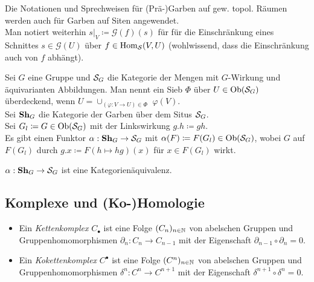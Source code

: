 \documentclass{cheat-sheet}
\newcommand{\CC}[1]{{#1}_{\bullet}} %
\newcommand{\CCC}[1]{{#1}^{\bullet}} %
\newcommand{\Garb}{\mathcal{G}} %
\begin{document}
\begin{bem}
  Die Notationen und Sprechweisen für (Prä-)Garben auf gew. topol. Räumen werden auch für Garben auf Siten angewendet. \\
  Man notiert weiterhin $s|_V \coloneqq \Garb(f)(s)$ für für die Einschränkung eines Schnittes $s \in \Garb(U)$ über $f \in \operatorname{Hom}_{\mathcal{S}}(V, U)$ (wohlwissend, dass die Einschränkung auch von $f$ abhängt).
\end{bem}

\begin{bsp}
  Sei $G$ eine Gruppe und $\mathcal{S}_G$ die Kategorie der Mengen mit $G$-Wirkung und äquivarianten Abbildungen. Man nennt ein Sieb $\Phi$ über $U \in \operatorname{Ob}(\mathcal{S}_G)$ überdeckend, wenn
  $U = \cup_{(\varphi : V \to U) \in \Phi} \,\, \varphi(V)$. \\
  Sei $\mathbf{Sh}_G$ die Kategorie der Garben über dem Situs $\mathcal{S}_G$. \\
  Sei $G_l \coloneqq G \in \operatorname{Ob}(\mathcal{S}_G)$ mit der Linkswirkung $g.h \coloneqq gh$. \\
  Es gibt einen Funktor $\alpha : \mathbf{Sh}_G \to \mathcal{S}_G$ mit $\alpha(F) \coloneqq F(G_l) \in \operatorname{Ob}(\mathcal{S}_G)$, wobei $G$ auf $F(G_l)$ durch $g.x \coloneqq F(h \mapsto hg)(x)$ für $x \in F(G_l)$ wirkt.
\end{bsp}

\begin{prop}
  $\alpha : \mathbf{Sh}_G \to \mathcal{S}_G$ ist eine Kategorienäquivalenz.
\end{prop}



\begin{samepage}

\section{Komplexe und (Ko-)Homologie}

\end{samepage}


\begin{defn}
  \begin{itemize}
    \item Ein \emph{Kettenkomplex} $\CC{C}$ ist eine Folge $(C_n)_{n \in \mathbb{N}}$ von abelschen Gruppen und Gruppenhomomorphismen $\partial_n : C_n \to C_{n-1}$ mit der Eigenschaft $\partial_{n-1} \circ \partial_n = 0$.
    \item Ein \emph{Kokettenkomplex} $\CCC{C}$ ist eine Folge $(C^n)_{n \in \mathbb{N}}$ von abelschen Gruppen und Gruppenhomomorphismen $\delta^n : C^n \to C^{n+1}$ mit der Eigenschaft $\delta^{n+1} \circ \delta^n = 0$.
  \end{itemize}
\end{defn}
\end{document}
